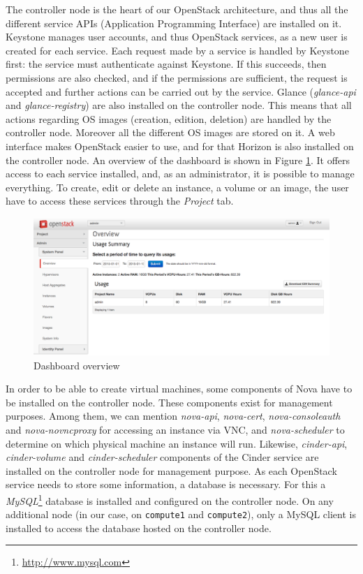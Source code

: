 The controller node is the heart of our OpenStack architecture, and thus all the different service APIs (Application Programming Interface) are installed on it. 
Keystone manages user accounts, and thus OpenStack services, as a new user is created for each service. 
Each request made by a service is handled by Keystone first: the service must authenticate against Keystone.
If this succeeds, then permissions are also checked, and if the permissions are sufficient, the request is accepted and further actions can be carried out by the service. 
Glance (\textit{glance-api} and \textit{glance-registry}) are also installed on the controller node. 
This means that all actions regarding OS images (creation, edition, deletion) are handled by the controller node.
Moreover all the different OS images are stored on it.
A web interface makes OpenStack easier to use, and for that Horizon is also installed on the controller node.
An overview of the dashboard is shown in Figure \ref{fig:dashboard}. 
It offers access to each service installed, and, as an administrator, it is possible to manage everything. 
To create, edit or delete an instance, a volume or an image, the user have to access these services through the \textit{Project} tab.
%
\begin{figure}[h]
	\centering
	\includegraphics[scale=0.36]{figures/dashboard.png}
	\caption{Dashboard overview}
	\label{fig:dashboard}
\end{figure}
%
In order to be able to create virtual machines, some components of Nova have to be installed on the controller node. These components exist for management purposes. 
Among them, we can mention \textit{nova-api}, \textit{nova-cert}, \textit{nova-consoleauth} and \textit{nova-novncproxy} for accessing an instance via VNC, and \textit{nova-scheduler} to determine on which physical machine an instance will run.
Likewise, \textit{cinder-api}, \textit{cinder-volume} and \textit{cinder-scheduler} components of the Cinder service are installed on the controller node for management purpose.
As each OpenStack service needs to store some information, a database is necessary. 
For this a \textit{MySQL}\footnote{\url{http://www.mysql.com}} database is installed and configured on the controller node. 
On any additional node (in our case, on \texttt{compute1} and \texttt{compute2}), only a MySQL client is installed to access the database hosted on the controller node.


